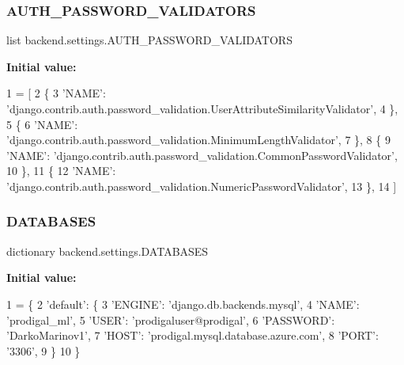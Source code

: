 \subsubsection{\texorpdfstring{A\+U\+T\+H\+\_\+\+P\+A\+S\+S\+W\+O\+R\+D\+\_\+\+V\+A\+L\+I\+D\+A\+T\+O\+RS}{AUTH\_PASSWORD\_VALIDATORS}}
{\footnotesize\ttfamily list backend.\+settings.\+A\+U\+T\+H\+\_\+\+P\+A\+S\+S\+W\+O\+R\+D\+\_\+\+V\+A\+L\+I\+D\+A\+T\+O\+RS}

{\bfseries Initial value\+:}
\begin{DoxyCode}
1 =  [
2     \{
3         \textcolor{stringliteral}{'NAME'}: \textcolor{stringliteral}{'django.contrib.auth.password\_validation.UserAttributeSimilarityValidator'},
4     \},
5     \{
6         \textcolor{stringliteral}{'NAME'}: \textcolor{stringliteral}{'django.contrib.auth.password\_validation.MinimumLengthValidator'},
7     \},
8     \{
9         \textcolor{stringliteral}{'NAME'}: \textcolor{stringliteral}{'django.contrib.auth.password\_validation.CommonPasswordValidator'},
10     \},
11     \{
12         \textcolor{stringliteral}{'NAME'}: \textcolor{stringliteral}{'django.contrib.auth.password\_validation.NumericPasswordValidator'},
13     \},
14 ]
\end{DoxyCode}
\mbox{\label{namespacebackend_1_1settings_a565b63f44faed90e16ee6d2a3fec4779}} 
\subsubsection{\texorpdfstring{D\+A\+T\+A\+B\+A\+S\+ES}{DATABASES}}
{\footnotesize\ttfamily dictionary backend.\+settings.\+D\+A\+T\+A\+B\+A\+S\+ES}

{\bfseries Initial value\+:}
\begin{DoxyCode}
1 =  \{
2     \textcolor{stringliteral}{'default'}: \{
3         \textcolor{stringliteral}{'ENGINE'}: \textcolor{stringliteral}{'django.db.backends.mysql'},
4         \textcolor{stringliteral}{'NAME'}: \textcolor{stringliteral}{'prodigal\_ml'},
5         \textcolor{stringliteral}{'USER'}: \textcolor{stringliteral}{'prodigaluser@prodigal'},
6         \textcolor{stringliteral}{'PASSWORD'}: \textcolor{stringliteral}{'DarkoMarinov1'},
7         \textcolor{stringliteral}{'HOST'}: \textcolor{stringliteral}{'prodigal.mysql.database.azure.com'},
8         \textcolor{stringliteral}{'PORT'}: \textcolor{stringliteral}{'3306'},
9     \}
10 \}
\end{DoxyCode}
\mbox{\label{namespacebackend_1_1settings_a733523a17e24a996b097f1114ffa3282}} 
